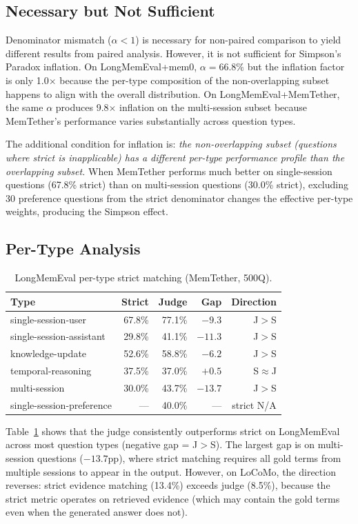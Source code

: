 \documentclass[10pt]{article}
\begin{document}
\subsection{Necessary but Not Sufficient}
Denominator mismatch ($\alpha < 1$) is necessary for non-paired comparison to yield different results from paired analysis. However, it is not sufficient for Simpson's Paradox inflation. On LongMemEval+mem0, $\alpha = 66.8\%$ but the inflation factor is only 1.0$\times$ because the per-type composition of the non-overlapping subset happens to align with the overall distribution. On LongMemEval+MemTether, the same $\alpha$ produces 9.8$\times$ inflation on the multi-session subset because MemTether's performance varies substantially across question types.

The additional condition for inflation is: \emph{the non-overlapping subset (questions where strict is inapplicable) has a different per-type performance profile than the overlapping subset.} When MemTether performs much better on single-session questions (67.8\% strict) than on multi-session questions (30.0\% strict), excluding 30 preference questions from the strict denominator changes the effective per-type weights, producing the Simpson effect.

\subsection{Per-Type Analysis}
\begin{table}[h]
\centering
\caption{LongMemEval per-type strict matching (MemTether, 500Q).}
\label{tab:pertype}
\begin{tabular}{lrrrr}
\toprule
Type & Strict & Judge & Gap & Direction \\
\midrule
single-session-user & 67.8\% & 77.1\% & $-9.3$ & J$>$S \\
single-session-assistant & 29.8\% & 41.1\% & $-11.3$ & J$>$S \\
knowledge-update & 52.6\% & 58.8\% & $-6.2$ & J$>$S \\
temporal-reasoning & 37.5\% & 37.0\% & $+0.5$ & S$\approx$J \\
multi-session & 30.0\% & 43.7\% & $-13.7$ & J$>$S \\
single-session-preference & --- & 40.0\% & --- & strict N/A \\
\bottomrule
\end{tabular}
\end{table}

Table~\ref{tab:pertype} shows that the judge consistently outperforms strict on LongMemEval across most question types (negative gap = J$>$S). The largest gap is on multi-session questions ($-13.7$pp), where strict matching requires all gold terms from multiple sessions to appear in the output. However, on LoCoMo, the direction reverses: strict evidence matching (13.4\%) exceeds judge (8.5\%), because the strict metric operates on retrieved evidence (which may contain the gold terms even when the generated answer does not).
\end{document}
